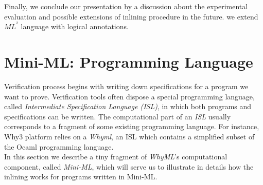 \documentclass[a4paper,11pt,oneside]{article}
\theoremstyle{plain}
\newcommand{\inlsrc}{\textit{ML}^{^2}}
\begin{document}
 Finally, we conclude our presentation by a discussion about the experimental evaluation and possible extensions of inlining procedure in the future.
we extend $\inlsrc$ language with logical annotations.  
 
 
%






%
%
% 

%
%
%
%



\newpage
\section{Mini-ML: Programming Language}
	Verification process begins with writing down specifications for a program we want to prove. 
	Verification tools often dispose a special programming language, called \textit{Intermediate Specification Language (ISL)}, in which both programs and specifications can be written. 
	The computational part of an \textit{ISL} usually corresponds to a fragment of some existing programming language. 
	For instance, Why3 platform relies on a \textit{Whyml}, an ISL which contains a simplified subset of the Ocaml programming language. \\
%	
%	
	In this section we describe a tiny fragment of \textit{WhyML}'s computational component, called \textit{Mini-ML}, which will serve us to illustrate in details how the inlining works for programs written in Mini-ML.
	
\end{document}
